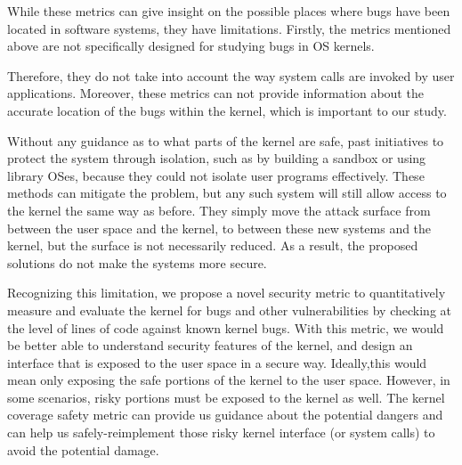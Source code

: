 While these metrics can give insight on the possible places where bugs have been located in software systems, they have limitations. Firstly, the metrics mentioned above are not specifically designed for studying bugs in OS kernels.


Therefore, they do not take into account the way system calls are invoked
by user applications.
Moreover, these metrics can not provide information about the accurate
location of the bugs within the kernel,
which is important to our study.


Without any guidance as to what parts of the kernel are safe, past
initiatives to protect the system through isolation,
such as by building a sandbox or using library OSes, because they could not
isolate user programs effectively.  
These methods can mitigate the problem, but any such system will still
allow access to the kernel the same way as before.
They simply move the attack surface from between the user space and the
kernel, 
to between these new systems and the kernel, but the surface is not
necessarily reduced.
As a result, the proposed solutions do not make the systems more secure.

Recognizing this limitation, we propose a novel security metric to
quantitatively measure and evaluate the kernel for bugs and other
vulnerabilities by checking at the level of lines of code against
known kernel bugs.
With this metric, we would be better able to understand security features
of the kernel, and design an interface that is exposed to the user space
in a secure way.
Ideally,this would mean only exposing the safe portions of the kernel to
the user space.
However, in some scenarios, risky portions must be exposed to the kernel as
well.
The kernel coverage safety metric %
 can provide us guidance about the potential dangers and
can help us safely-reimplement those risky kernel interface (or system
calls) to avoid the potential damage.



